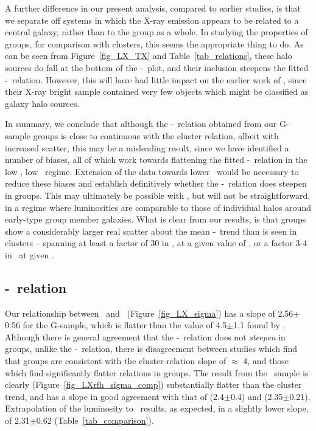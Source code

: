 \documentclass[usenatbib]{mn2e}
\begin{document}
A further difference in our present analysis, compared to earlier studies, is
that we separate off systems in which the X-ray emission appears to be related to
a central galaxy, rather than to the group as a whole.  In studying the
properties of groups, for comparison with clusters, this seems the appropriate
thing to do.  As can be seen from Figure~\ref{fig_LX_TX} and
Table~\ref{tab_relations}, these halo sources do fall at the bottom of the
\LX-\TX\ plot, and their inclusion steepens the fitted \LX-\TX\ relation.
However, this will have had little impact on the earlier work of
\citet{helsdon00a}, since their X-ray bright sample contained very few objects
which might be classified as galaxy halo sources.

In summary, we conclude that although the \LX-\TX\ relation obtained from our
G-sample groups is close to continuous with the cluster relation, albeit with
increased scatter, this may be a misleading result, since we have identified a
number of biases, all of which work towards flattening the fitted \LX-\TX\
relation in the low \TX, low \LX\ regime.  Extension of the data towards lower
\LX\ would be necessary to reduce these biases and establish definitively whether
the \LX-\TX\ relation does steepen in groups. This may ultimately be possible
with \XMM, but will not be  straightforward, in a regime where luminosities are
comparable to those of individual halos around early-type group member galaxies.
What is clear from our results, is that groups show a considerably larger real
scatter about the mean \LX-\TX\ trend than is seen in clusters -- spanning at
least a factor of 30 in \LX, at a given value of \TX, or a factor 3-4 in \TX\ at
given \LX.


\subsection{\LX-\sigmav\ relation}
\label{subsec_Lsig}

Our relationship between \LX\ and \sigmav\ (Figure~\ref{fig_LX_sigma}) has a
slope of 2.56$\pm$0.56 for the G-sample, which is flatter than the value of
4.5$\pm$1.1 found by \citet{helsdon00a}.  Although there is general agreement
that the \LX-\sigmav\ relation does not {\it steepen} in groups, unlike the
\LX-\TX\ relation, there is disagreement between studies
\citep[e.g][]{ponman96,mulchaey98,helsdon00a,mahdavi01} which find that groups
are consistent with the cluster-relation slope of $\approx$ 4, and those
\citep{mahdavi97,xue00,helsdon00b,mahdavi00} which find significantly flatter
relations in groups.  The result from the \GEMS\ sample is clearly
(Figure~\ref{fig_LXrfh_sigma_comp}) substantially flatter than the cluster trend,
and has a slope in good agreement with that of \citet{helsdon00b} (2.4$\pm$0.4)
and \citet{xue00} (2.35$\pm$0.21).  Extrapolation of the luminosity to \rfh\
results, as expected, in a slightly lower slope, of 2.31$\pm$0.62
(Table~\ref{tab_comparison}).
\end{document}
